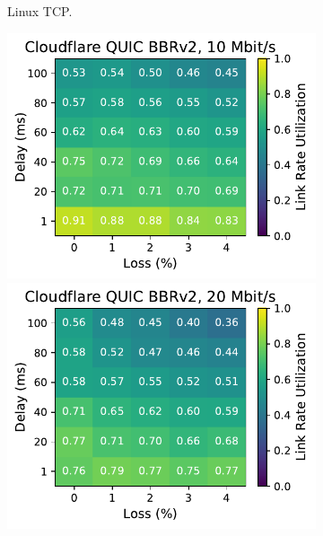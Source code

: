 \begin{figure}[ht]
\begin{subfigure}[b]{0.22\linewidth}
        \caption{Linux TCP.}
    \end{subfigure}
    \begin{subfigure}[b]{0.22\linewidth}
        \includegraphics[width=\linewidth,trim={0 0 2cm 0},clip]{figures/heatmaps/heatmap_quiche_bbr2_10mbps.pdf}
        \includegraphics[width=\linewidth,trim={0 0 2cm 0},clip]{figures/heatmaps/heatmap_quiche_bbr2_20mbps.pdf}

\end{subfigure}
\end{figure}
